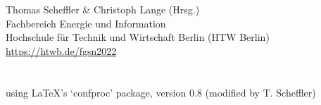 \documentclass[a4paper,%
  10pt,%
  oneside,%
  onesidepapers,%
  electronic,%
  binding=0mm,%
  papers=countpages,%
  headers=allpages,%
  bib=backref,%
  paperselec=all,%
  onecoltoc,%
  tocnum=right,%
  twocolbib,%
  twocolindex,%
  checktitle=false,%
  checkauthor=false,%
  showpapernumber=false,%
  movepagenumber=true,%
  showmarginlines=false,%
  colorheaders=black,%
  debug=false,%
  verbose=false,%
  pdftk=false,%
  geometry={text={175truemm,226truemm},%
    inner=0.69in,top=23.9mm,bottom=38mm,footskip=10.4mm,voffset=-2.8mm},%
  ]{confproc_22}
\author{\procpdfauthor}
\title{\FGSNxname\\ \FGSNxaddress}
\date{\FGSNxdate}
\renewcommand{\contentsname}{Day-by-Day Conference Program}
\newcommand{\PICTPATH}{pictures/}
\begin{document}
\frontmatter
\setcounter{page}{1}

\renewcommand{\contentsname}{\texorpdfstring{}{Conference Program}}
\newpage
\vspace*{1.7cm}
\thispagestyle{empty}
\\ Thomas Scheffler \& Christoph Lange (Hrsg.)\\ Fachbereich Energie und Information\\
Hochschule für Technik und Wirtschaft Berlin (HTW Berlin)\\
\url{https://htwb.de/fgsn2022}\\
\vspace*{0.15cm}\newline
{}\\
\vspace*{0.35cm}\newline
{}\\
using \LaTeX's `confproc' package, version 0.8 (modified by T. Scheffler)\\
\vspace*{0.35cm}\newline

\otherpagestyle
\clearsingleordoublepage
\vspace*{0.6cm}
\thisotherpagestyle
{}
\end{document}
